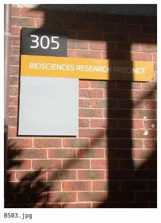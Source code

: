 \documentclass{article}
\begin{document}
\begin{figure}[h]
  \centering
  \begin{subfigure}[t]{0.22\textwidth}
    \centering
    \includegraphics[width=0.9\textwidth]{../train/task1/BS03}
    \caption[BS03]{
      \lstinline{BS03.jpg}
    }
    \label{fig:bs03}
  \end{subfigure}
  \begin{subfigure}[t]{0.22\textwidth}
    \centering

\end{subfigure}
\end{figure}
\end{document}
